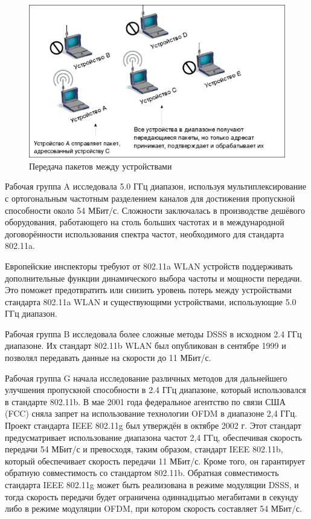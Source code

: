 \begin{figure}
    \includegraphics[width=1\textwidth]{graphics/wlan_diagram.eps}
    \caption{Передача пакетов между устройствами}
    \label{fig:wlan_diagram}
\end{figure}

Рабочая группа A исследовала 5.0 ГГц диапазон, используя мультиплексирование с
ортогональным частотным разделением каналов для достижения пропускной
способности около 54 МБит/с. Сложности заключалась в производстве дешёвого
оборудования, работающего на столь больших частотах и в международной
договорённости использования спектра частот, необходимого для стандарта 802.11a.

Европейские инспекторы требуют от 802.11a WLAN устройств поддерживать
дополнительные функции динамического выбора частоты и мощности передачи. Это
поможет предотвратить или снизить уровень потерь между устройствами стандарта
802.11a WLAN и существующими устройствами, использующие 5.0 ГГц диапазон.

Рабочая группа B исследовала более сложные методы DSSS в исходном 2.4 ГГц
диапазоне. Их стандарт 802.11b WLAN был опубликован в сентябре 1999 и позволял
передавать данные на скорости до 11 МБит/с.

Рабочая группа G начала исследование различных методов для дальнейшего
улучшения пропускной способности в 2.4 ГГц диапазоне, который использовался в
стандарте 802.11b. В мае 2001 года федеральное агентство по связи США (FCC) сняла
запрет на использование технологии OFDM в диапазоне 2,4 ГГц. Проект стандарта
IEEE 802.11g был утверждён в октябре 2002 г. Этот стандарт предусматривает
использование диапазона частот 2,4 ГГц, обеспечивая скорость передачи 54 МБит/с
и превосходя, таким образом, стандарт IEEE 802.11b, который обеспечивает
скорость передачи 11 МБит/с. Кроме того, он гарантирует обратную совместимость
со стандартом 802.11b. Обратная совместимость стандарта IEEE 802.11g может быть
реализована в режиме модуляции DSSS, и тогда скорость передачи будет ограничена
одиннадцатью мегабитами в секунду либо в режиме модуляции OFDM, при котором
скорость составляет 54 МБит/с.

